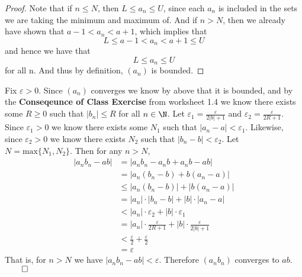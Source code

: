 \documentclass[11pt]{exam}
\begin{document}
\begin{enumerate}
\begin{solution}
\begin{proof}
                    Note that if $n \leq N$, then $L \leq a_n \leq U$, since each $a_n$ is included in the sets we are taking the minimum and maximum of. And if $n > N$, then we already have shown that $a-1 < a_n < a + 1$, which implies that 
                    $$L \leq a - 1 < a_n < a + 1 \leq U$$
                    and hence we have that 
                    $$L \leq a_n \leq U$$
                    for all n. And thus by definition, $(a_n)$ is bounded. 
                \end{proof}
                Fix $\varepsilon > 0$. Since $(a_n)$ converges we know by above that it is bounded, and by the \textbf{Conseqeunce of Class Exercise} from worksheet 1.4 we know there exists some $R \geq 0$ such that $|b_n| \leq R$ for all $n \in \N$. Let $\varepsilon_1 = \frac{\varepsilon}{2|b| + 1}$ and $\varepsilon_2 = \frac{\varepsilon}{2R + 1}$. Since $\varepsilon_1 > 0$ we know there exists some $N_1$ such that $|a_n - a| < \varepsilon_1$. Likewise, since $\varepsilon_2 > 0$ we know there exists $N_2$ such that $|b_n - b| < \varepsilon_2$. Let $N = \text{max}\{N_1, N_2\}$. Then for any $n > N$, 
                \begin{align*}
                    |a_nb_n - ab| &=     |a_nb_n - a_nb + a_nb - ab| \\
                                  &=     |a_n(b_n - b) + b(a_n - a)| \\
                                  &\leq  |a_n(b_n -b)| + |b(a_n - a)| \\
                                  &=     |a_n| \cdot |b_n - b| + |b| \cdot |a_n - a| \\
                                  &<     |a_n| \cdot \varepsilon_2 + |b| \cdot \varepsilon_1 \\
                                  &=     |a_n| \cdot \frac{\varepsilon}{2R + 1} + |b| \cdot \frac{\varepsilon}{2|b| + 1} \\ 
                                  &<     \frac{\varepsilon}{2} + \frac{\varepsilon}{2} \\
                                  &=     \varepsilon
                \end{align*}
                That is, for $n > N$ we have $|a_nb_n - ab| < \varepsilon$. Therefore $(a_nb_n)$ converges to $ab$. $\hspace*{0em plus 1fill} \qed$
            \end{solution}
        

\end{enumerate}
\end{document}
